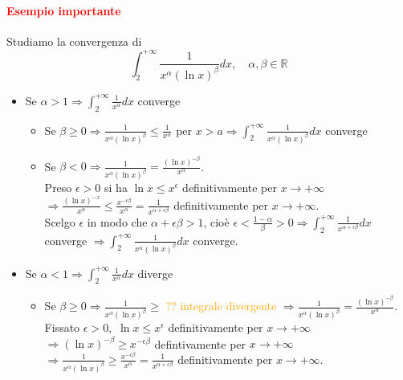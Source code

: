 \documentclass{article}
\newcommand{\R}{\mathbb{R}}
\begin{document}
\paragraph{\textcolor{red}{Esempio importante}}
Studiamo la convergenza di 
\begin{equation*}
    \int_{2}^{+\infty} \frac{1}{x^\alpha(\ln x)^\beta}dx, \,\,\,\,\,\, \alpha,\beta \in \R
\end{equation*}
\begin{itemize}
    \item Se $\alpha >1 \Rightarrow \int_{2}^{+\infty}\frac{1}{x^\alpha}dx$ converge
    \begin{itemize}
        \item Se $\beta \geq 0 \Rightarrow \frac{1}{x^\alpha(\ln x)^\beta} \leq \frac{1}{x^\alpha}$ per $x>a \Rightarrow \int_{2}^{+\infty} \frac{1}{x^\alpha(\ln x)^\beta}dx$ converge
        \item Se $\beta <0 \Rightarrow \frac{1}{x^\alpha(\ln x)^\beta} = \frac{(\ln x)^{-\beta}}{x^\alpha}$.\\ Preso $\epsilon > 0$ si ha $\ln x \leq x^\epsilon$ definitivamente per $x \rightarrow+\infty$ $\Rightarrow \frac{(\ln x)^{-x}}{x^\alpha} \leq \frac{x^{-\epsilon \beta}}{x^\alpha}=\frac{1}{x^{\alpha+\epsilon\beta}}$ definitivamente per $x\rightarrow +\infty$.\\
        Scelgo $\epsilon$ in modo che $\alpha+\epsilon\beta > 1$, cioè $\epsilon < \frac{1-\alpha}{\beta}>0 \Rightarrow \int_{2}^{+\infty} \frac{1}{x^{\alpha+\epsilon\beta}}dx$ converge $\Rightarrow \int_{2}^{+\infty} \frac{1}{x^\alpha(\ln x)^\beta}dx$ converge.
    \end{itemize}
    \item Se $\alpha < 1 \Rightarrow \int_{2}^{+\infty} \frac{1}{x^\alpha}dx$ diverge
    \begin{itemize}
        \item Se $\beta \geq 0 \Rightarrow \frac{1}{x^\alpha(\ln x)^\beta }\geq$ \textcolor{orange}{?? integrale divergente} $\Rightarrow \frac{1}{x^\alpha(\ln x)^\beta}= \frac{(\ln x)^{-\beta}}{x^\alpha}$.\\
        Fissato $\epsilon>0, \,\,\ln x \leq x^\epsilon $ definitivamente per $x \rightarrow +\infty$ $\Rightarrow (\ln x)^{-\beta}\geq x^{-\epsilon\beta}$ defintivamente per $x \rightarrow +\infty$ $\Rightarrow \frac{1}{x^\alpha (\ln x)^\beta} \geq \frac{x^{-\epsilon\beta}}{x^\alpha} = \frac{1}{x^{\alpha+\epsilon\beta}}$ definitivamente per $x \rightarrow +\infty$.\\

\end{itemize}
\end{itemize}
\end{document}
